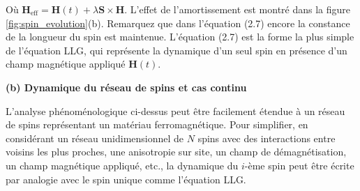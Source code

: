 \documentclass{article}
\begin{document}
	Où $\mathbf{H}_{\text{eff}} = \mathbf{H}(t) + \lambda \mathbf{S} \times \mathbf{H}$. L'effet de l'amortissement est montré dans la figure \ref{fig:spin_evolution}(b). Remarquez que dans l'équation (2.7) encore la constance de la longueur du spin est maintenue. L'équation (2.7) est la forme la plus simple de l'équation LLG, qui représente la dynamique d'un seul spin en présence d'un champ magnétique appliqué $\mathbf{H}(t)$.
	
	\textbf{(b) Dynamique du réseau de spins et cas continu}
	
	L'analyse phénoménologique ci-dessus peut être facilement étendue à un réseau de spins représentant un matériau ferromagnétique. Pour simplifier, en considérant un réseau unidimensionnel de $N$ spins avec des interactions entre voisins les plus proches, une anisotropie sur site, un champ de démagnétisation, un champ magnétique appliqué, etc., la dynamique du $i$-ème spin peut être écrite par analogie avec le spin unique comme l'équation LLG.
\end{document}
